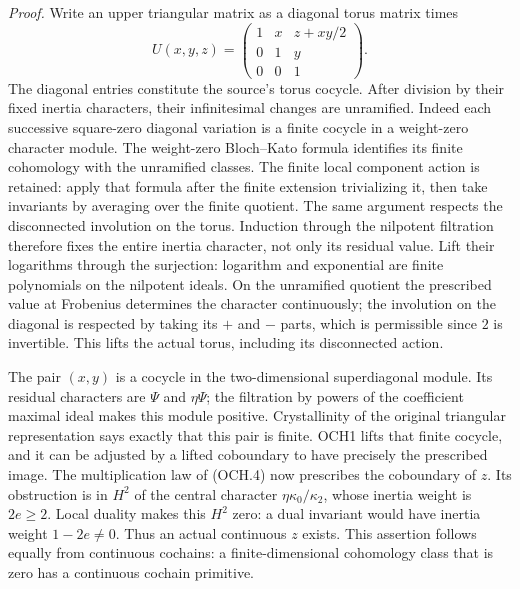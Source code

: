 \emph{Proof.}
Write an upper triangular matrix as a diagonal torus matrix times
\[
 U(x,y,z)=
 \begin{pmatrix}1&x&z+xy/2\\0&1&y\\0&0&1\end{pmatrix}.
 \tag{OCH.4}
\]
The diagonal entries constitute the source's torus cocycle.
After division by their fixed inertia characters, their infinitesimal
changes are unramified.  Indeed each successive square-zero diagonal
variation is a finite cocycle in a weight-zero character module.
The weight-zero Bloch--Kato formula identifies its finite cohomology
with the unramified classes.  The finite local component action is
retained: apply that formula after the finite extension trivializing
it, then take invariants by averaging over the finite quotient.
The same argument respects the disconnected involution on the torus.
Induction through the nilpotent filtration therefore fixes the entire
inertia character, not only its residual value.
Lift their logarithms through the surjection: logarithm and exponential are finite polynomials on the
nilpotent ideals.  On the unramified quotient the prescribed value
at Frobenius determines the character continuously; the involution
on the diagonal is respected by taking its \(+\) and \(-\)
parts, which is permissible since \(2\) is invertible.
This lifts the actual torus, including its disconnected action.

The pair \((x,y)\) is a cocycle in the two-dimensional
superdiagonal module.  Its residual characters are \(\Psi\)
and \(\eta\Psi\); the filtration by powers of the coefficient
maximal ideal makes this module positive.  Crystallinity of the
original triangular representation says exactly that this pair is
finite.  OCH1 lifts that finite cocycle, and it can be adjusted by a
lifted coboundary to have precisely the prescribed image.
The multiplication law of (OCH.4) now prescribes the coboundary of
\(z\).  Its obstruction is in \(H^2\) of the central character
\(\eta\kappa_0/\kappa_2\), whose inertia weight is \(2e\ge2\).
Local duality makes this \(H^2\) zero: a dual invariant would have
inertia weight \(1-2e\ne0\).  Thus an actual continuous \(z\)
exists.  This assertion follows equally from continuous cochains:
a finite-dimensional cohomology class that is zero has a continuous
cochain primitive.

